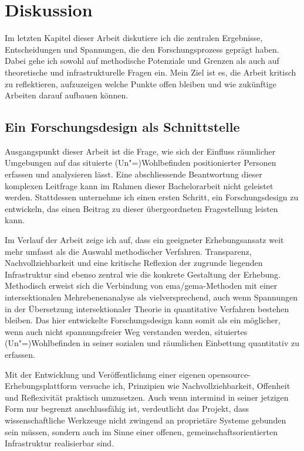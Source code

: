 \chapter{Diskussion} \label{sec:diskussion}

Im letzten Kapitel dieser Arbeit diskutiere ich die zentralen Ergebnisse, Entscheidungen und Spannungen, die den Forschungsprozess geprägt haben. Dabei gehe ich sowohl auf methodische Potenziale und Grenzen als auch auf theoretische und infrastrukturelle Fragen ein. Mein Ziel ist es, die Arbeit kritisch zu reflektieren, aufzuzeigen welche Punkte offen bleiben und wie zukünftige Arbeiten darauf aufbauen können.

\section{Ein Forschungsdesign als Schnittstelle}

Ausgangspunkt dieser Arbeit ist die Frage, wie sich der Einfluss räumlicher Umgebungen auf das situierte (Un\nobreakdash"=)Wohlbefinden  positionierter Personen erfassen und analysieren lässt. Eine abschliessende Beantwortung dieser komplexen Leitfrage kann im Rahmen dieser Bachelorarbeit nicht geleistet werden. Stattdessen unternehme ich einen ersten Schritt, ein Forschungsdesign zu entwickeln, das einen Beitrag zu dieser übergeordneten Fragestellung leisten kann.

Im Verlauf der Arbeit zeige ich auf, dass ein geeigneter Erhebungsansatz weit mehr umfasst als die Auswahl methodischer Verfahren. Transparenz, Nachvollziehbarkeit und eine kritische Reflexion der zugrunde liegenden Infrastruktur sind ebenso zentral wie die konkrete Gestaltung der Erhebung. Methodisch erweist sich die Verbindung von \gls{ema}/\gls{gema}-Methoden mit einer intersektionalen Mehrebenenanalyse als vielversprechend, auch wenn Spannungen in der Übersetzung intersektionaler Theorie in quantitative Verfahren bestehen bleiben. Das hier entwickelte Forschungsdesign kann somit als ein möglicher, wenn auch nicht spannungsfreier Weg verstanden werden, situiertes (Un\nobreakdash"=)Wohlbefinden in seiner sozialen und räumlichen Einbettung quantitativ zu erfassen.

Mit der Entwicklung und Veröffentlichung einer eigenen \gls{opensource}-Erhebungsplattform versuche ich, Prinzipien wie Nachvollziehbarkeit, Offenheit und Reflexivität praktisch umzusetzen. Auch wenn \gls{intermind} in seiner jetzigen Form nur begrenzt anschlussfähig ist, verdeutlicht das Projekt, dass wissenschaftliche Werkzeuge nicht zwingend an proprietäre Systeme gebunden sein müssen, sondern auch im Sinne einer offenen, gemeinschaftsorientierten Infrastruktur realisierbar sind.

